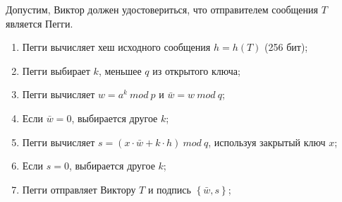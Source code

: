 Допустим, Виктор должен удостовериться, что отправителем сообщения $T$ является Пегги.

\begin{enumerate}

\item Пегги вычисляет хеш исходного сообщения $h = h(T)$ (256 бит);
\item Пегги выбирает $k$, меньшее $q$ из открытого ключа;
\item Пегги вычисляет $w = a^k \ mod \ p$ и $\bar{w} = w \ mod \ q$;
\item Если $\bar{w} = 0$, выбирается другое $k$;
\item Пегги вычисляет $s = (x \cdot \bar{w} + k \cdot h) \ mod \ q$, используя закрытый ключ $x$;
\item Если $s = 0$, выбирается другое $k$;
\item Пегги отправляет Виктору $T$ и подпись $\left\{\bar{w}, s \right\}$;

\end{enumerate}
